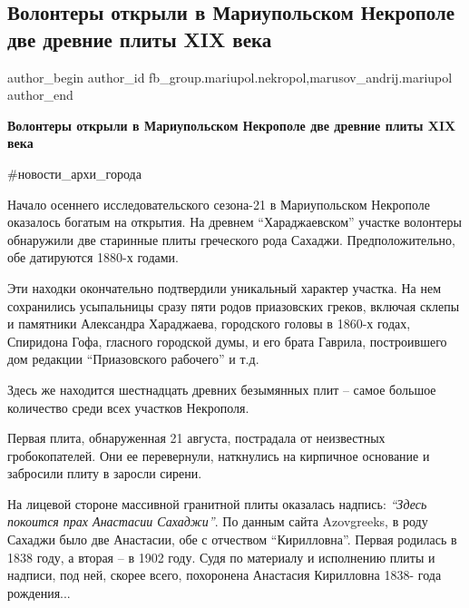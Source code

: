  
 
 
 
 

\subsection{Волонтеры открыли в Мариупольском Некрополе две древние плиты XIX века}
\label{sec:30_08_2021.fb.fb_group.mariupol.nekropol.1.volontery_otkryli_dve_drevnie_plity_xix_veka}
 
\ifcmt
 author_begin
   author_id fb_group.mariupol.nekropol,marusov_andrij.mariupol
 author_end
\fi

\vspace{0.5cm}
\textbf{Волонтеры открыли в Мариупольском Некрополе две древние плиты XIX века}

\#новости\_архи\_города

Начало осеннего исследовательского сезона-21 в Мариупольском Некрополе
оказалось богатым на открытия. На древнем \enquote{Хараджаевском} участке волонтеры
обнаружили две старинные плиты греческого рода Сахаджи. Предположительно, обе
датируются 1880-х годами.

Эти находки окончательно подтвердили уникальный характер участка. На нем
сохранились усыпальницы сразу пяти родов приазовских греков, включая склепы и
памятники Александра Хараджаева, городского головы в 1860-х годах, Спиридона
Гофа, гласного городской думы, и его брата Гаврила, построившего дом редакции
\enquote{Приазовского рабочего} и т.д.

Здесь же находится шестнадцать древних безымянных плит – самое большое
количество среди всех участков Некрополя.

Первая плита, обнаруженная 21 августа, пострадала от неизвестных
гробокопателей. Они ее перевернули, наткнулись на кирпичное основание и
забросили плиту в заросли сирени. 

На лицевой стороне массивной гранитной плиты оказалась надпись: \emph{\enquote{Здесь покоится
прах Анастасии Сахаджи}}. По данным сайта Azovgreeks, в роду Сахаджи было две
Анастасии, обе с отчеством \enquote{Кирилловна}. Первая родилась в 1838 году, а вторая
– в 1902 году. Судя по материалу и исполнению плиты и надписи, под ней, скорее
всего, похоронена Анастасия Кирилловна 1838- года рождения...

